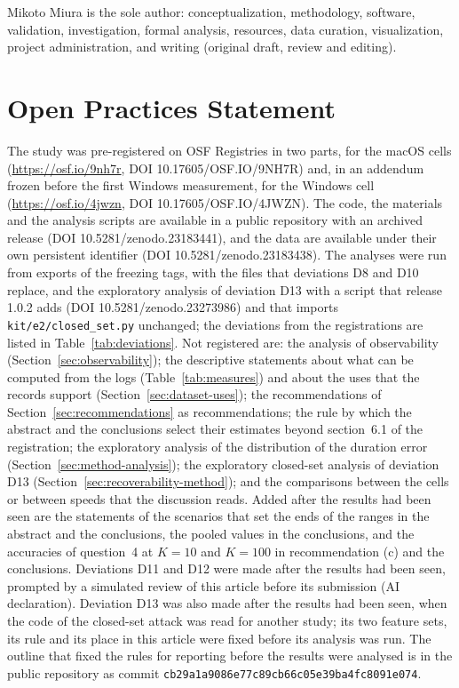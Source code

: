 Mikoto Miura is the sole author: conceptualization, methodology, software, validation, investigation, formal analysis,
resources, data curation, visualization, project administration, and writing (original draft, review and editing).

\section*{Open Practices Statement}

The study was pre-registered on OSF Registries in two parts, for the macOS cells (\url{https://osf.io/9nh7r},
DOI 10.17605/OSF.IO/9NH7R) and, in an addendum frozen before the first Windows measurement, for the Windows cell
(\url{https://osf.io/4jwzn}, DOI 10.17605/OSF.IO/4JWZN). The code, the materials and the analysis scripts are available
in a public repository with an archived release (DOI 10.5281/zenodo.23183441), and the data are available under their
own persistent identifier (DOI 10.5281/zenodo.23183438). The analyses were run from exports of the freezing tags, with
the files that deviations D8 and D10 replace, and the exploratory analysis of deviation D13 with a script that
release 1.0.2 adds (DOI 10.5281/zenodo.23273986) and that imports \texttt{kit/e2/closed\_set.py} unchanged; the
deviations from
the registrations are listed in
Table~\ref{tab:deviations}. Not registered are: the analysis of observability (Section~\ref{sec:observability}); the
descriptive statements about what can be computed from the logs (Table~\ref{tab:measures}) and about the uses that the
records support (Section~\ref{sec:dataset-uses}); the recommendations of Section~\ref{sec:recommendations} as
recommendations; the rule by which the abstract and the conclusions select their estimates beyond section~6.1 of the
registration; the exploratory analysis of the distribution of the duration error (Section~\ref{sec:method-analysis});
the exploratory closed-set analysis of deviation D13 (Section~\ref{sec:recoverability-method}); and the comparisons
between the cells or between speeds that the discussion reads. Added after the results had been
seen are the statements of the scenarios that set the ends of the ranges in the abstract and the conclusions, the
pooled values in the conclusions, and the accuracies of question~4 at $K = 10$ and $K = 100$ in recommendation (c) and
the conclusions. Deviations D11 and D12 were made after
the results had been seen, prompted by a simulated review of this article before its submission (AI declaration).
Deviation D13 was also made after the results had been seen, when the code of the closed-set attack was read for
another study; its two feature sets, its rule and its place in this article were fixed before its analysis was run.
The outline that fixed the rules for reporting before the results were analysed is in the public repository as commit
\texttt{cb29a1a9086e77c89cb66c05e39ba4fc8091e074}.
